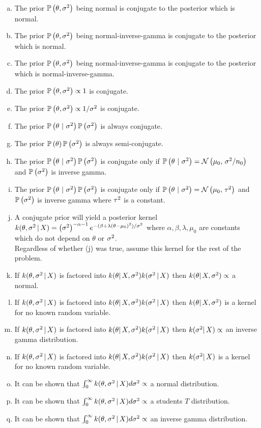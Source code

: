 \documentclass[12pt]{article}
\begin{document}
\begin{enumerate}[(a)]
\item The prior $\mathbb{P}\left(\theta, \sigma^2\right)$ being normal is conjugate to the posterior which is normal.
\item The prior $\mathbb{P}\left(\theta, \sigma^2\right)$ being normal-inverse-gamma is conjugate to the posterior which is normal.
\item The prior $\mathbb{P}\left(\theta, \sigma^2\right)$ being normal-inverse-gamma is conjugate to the posterior which is normal-inverse-gamma.
\item The prior $\mathbb{P}\left(\theta, \sigma^2\right) \propto 1$ is conjugate.
\item The prior $\mathbb{P}\left(\theta, \sigma^2\right) \propto 1/{\sigma^2}$ is conjugate.
\item The prior $\mathbb{P}\left(\theta~|~\sigma^2\right)\mathbb{P}\left(\sigma^2\right)$ is always conjugate.
\item The prior $\mathbb{P}\left(\theta\right)\mathbb{P}\left(\sigma^2\right)$ is always semi-conjugate.
\item The prior $\mathbb{P}\left(\theta~|~\sigma^2\right)\mathbb{P}\left(\sigma^2\right)$ is conjugate only if $\mathbb{P}\left(\theta~|~\sigma^2\right) = \mathcal{N}\left(\mu_0,\,\sigma^2 / n_0\right)$ and $\mathbb{P}\left(\sigma^2\right)$ is inverse gamma.
\item The prior $\mathbb{P}\left(\theta~|~\sigma^2\right)\mathbb{P}\left(\sigma^2\right)$ is conjugate only if $\mathbb{P}\left(\theta~|~\sigma^2\right) = \mathcal{N}\left(\mu_0,\,\tau^2\right)$ and $\mathbb{P}\left(\sigma^2\right)$ is inverse gamma where $\tau^2$ is a constant.
\item A conjugate prior will yield a posterior kernel $k(\theta, \sigma^2\,|\,X) = \left(\sigma^2\right)^{-\alpha - 1} e^{-(\beta + \lambda \left(\theta - \mu_0\right)^2) / \sigma^2}$ where $\alpha, \beta, \lambda, \mu_0$ are constants which do not depend on $\theta$ or $\sigma^2$. \\

Regardless of whether (j) was true, assume this kernel for the rest of the problem.

\item If $k(\theta, \sigma^2\,|\,X)$ is factored into $k(\theta|\,X, \sigma^2) k(\sigma^2\,|\,X)$ then $k(\theta|\,X, \sigma^2) \propto$ a normal.
\item If $k(\theta, \sigma^2\,|\,X)$ is factored into $k(\theta|\,X, \sigma^2) k(\sigma^2\,|\,X)$ then $k(\theta|\,X, \sigma^2)$ is a kernel for no known random variable.
\item If $k(\theta, \sigma^2\,|\,X)$ is factored into $k(\theta|\,X, \sigma^2) k(\sigma^2\,|\,X)$ then $k(\sigma^2|\,X) \propto$ an inverse gamma distribution.
\item If $k(\theta, \sigma^2\,|\,X)$ is factored into $k(\theta|\,X, \sigma^2) k(\sigma^2\,|\,X)$ then $k(\sigma^2|\,X)$ is a kernel for no known random variable.
\item It can be shown that $\int_0^\infty k(\theta, \sigma^2\,|\,X) d\sigma^2 \propto$ a normal distribution.
\item It can be shown that $\int_0^\infty k(\theta, \sigma^2\,|\,X) d\sigma^2 \propto$ a students $T$ distribution.
\item It can be shown that $\int_0^\infty k(\theta, \sigma^2\,|\,X) d\sigma^2 \propto$ an inverse gamma distribution.


\end{enumerate}
\end{document}
